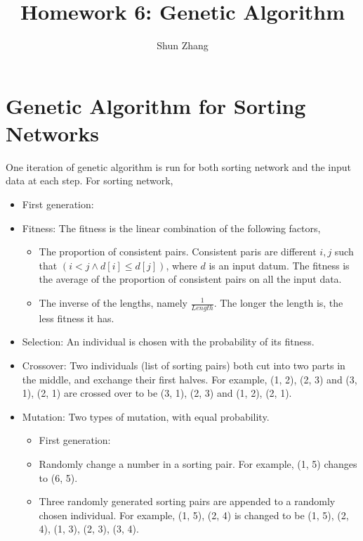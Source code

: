 \documentclass[11pt]{article}
\title{Homework 6: Genetic Algorithm}
\author{Shun Zhang}
\date{}
\begin{document}
\maketitle

\section{Genetic Algorithm for Sorting Networks}

One iteration of genetic algorithm is run for both sorting network and
the input data at each step. For sorting network,

\begin{itemize}

\item First generation:

\item Fitness: The fitness is the linear combination of the following
factors,

\begin{itemize}
\item The proportion of consistent pairs.
Consistent paris are different $i, j$ such that $(i < j \land d[i]
\leq d[j])$, where $d$ is an input datum. The fitness is the average
of the proportion of consistent pairs on all the input data. 

\item The inverse of the lengths, namely $\frac{1}{Length}$. The
longer the length is, the less fitness it has.
\end{itemize}

\item Selection: An individual is chosen with the probability of its
fitness.

\item Crossover: Two individuals (list of sorting pairs) both cut into
two parts in the middle, and exchange their first halves. For example,
(1, 2), (2, 3) and (3, 1), (2, 1) are crossed over to be (3, 1), (2,
3) and (1, 2), (2, 1).

\item Mutation: Two types of mutation, with equal probability.

\begin{itemize}

\item First generation:

\item Randomly change a number in a sorting pair. For example, (1, 5)
changes to (6, 5).

\item Three randomly generated sorting pairs are
appended to a randomly chosen individual. For example, (1, 5), (2, 4)
is changed to be (1, 5), (2, 4), (1, 3), (2, 3), (3, 4).
\end{itemize}
\end{itemize}
\end{document}
